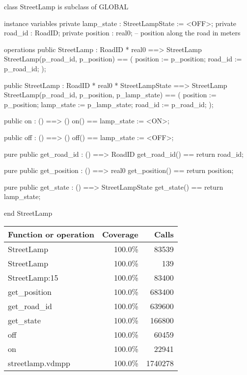 \documentclass[a4paper]{article}
\begin{document}
\title{}
\author{}
\begin{vdm_al}
class StreetLamp is subclass of GLOBAL

instance variables
    private lamp_state : StreetLampState := <OFF>;
    private road_id : RoadID;
    private position : real0; -- position along the road in meters

operations
    public StreetLamp : RoadID * real0 ==> StreetLamp
    StreetLamp(p_road_id, p_position) == (
        position := p_position;
        road_id := p_road_id;
    );

    public StreetLamp : RoadID * real0 * StreetLampState ==> StreetLamp
    StreetLamp(p_road_id, p_position, p_lamp_state) == (
        position := p_position;
        lamp_state := p_lamp_state;
        road_id := p_road_id;
    );

    public on : () ==> ()
    on() == lamp_state := <ON>;

    public off : () ==> ()
    off() == lamp_state := <OFF>;

    pure public get_road_id : () ==> RoadID
    get_road_id() == return road_id;

    pure public get_position : () ==> real0
    get_position() == return position;

    pure public get_state : () ==> StreetLampState
    get_state() == return lamp_state;

end StreetLamp
\end{vdm_al}
\bigskip
\begin{longtable}{|l|r|r|}
\hline
Function or operation & Coverage & Calls \\
\hline
\hline
StreetLamp & 100.0\% & 83539 \\
\hline
StreetLamp & 100.0\% & 139 \\
\hline
StreetLamp:15 & 100.0\% & 83400 \\
\hline
get\_position & 100.0\% & 683400 \\
\hline
get\_road\_id & 100.0\% & 639600 \\
\hline
get\_state & 100.0\% & 166800 \\
\hline
off & 100.0\% & 60459 \\
\hline
on & 100.0\% & 22941 \\
\hline
\hline
streetlamp.vdmpp & 100.0\% & 1740278 \\
\hline
\end{longtable}
\end{document}
